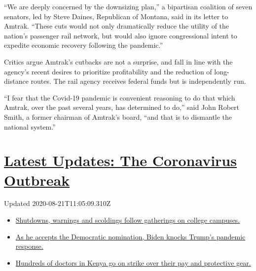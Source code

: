 ``We are deeply concerned by the downsizing plan,'' a bipartisan
coalition of seven senators, led by Steve Daines, Republican of Montana,
said in its letter to Amtrak. ``These cuts would not only dramatically
reduce the utility of the nation's passenger rail network, but would
also ignore congressional intent to expedite economic recovery following
the pandemic.''

Critics argue Amtrak's cutbacks are not a surprise, and fall in line
with the agency's recent desires to prioritize profitability and the
reduction of long-distance routes. The rail agency receives federal
funds but is independently run.

``I fear that the Covid-19 pandemic is convenient reasoning to do that
which Amtrak, over the past several years, has determined to do,'' said
John Robert Smith, a former chairman of Amtrak's board, ``and that is to
dismantle the national system.''

\hypertarget{latest-updates-the-coronavirus-outbreak}{%
\section{\texorpdfstring{\href{https://www.nytimes3xbfgragh.onion/2020/08/21/world/covid-19-coronavirus.html?action=click\&pgtype=Article\&state=default\&region=MAIN_CONTENT_1\&context=storylines_live_updates}{Latest
Updates: The Coronavirus
Outbreak}}{Latest Updates: The Coronavirus Outbreak}}\label{latest-updates-the-coronavirus-outbreak}}

Updated 2020-08-21T11:05:09.310Z

\begin{itemize}
\tightlist
\item
  \href{https://www.nytimes3xbfgragh.onion/2020/08/21/world/covid-19-coronavirus.html?action=click\&pgtype=Article\&state=default\&region=MAIN_CONTENT_1\&context=storylines_live_updates\#link-4690b6aa}{Shutdowns,
  warnings and scoldings follow gatherings on college campuses.}
\item
  \href{https://www.nytimes3xbfgragh.onion/2020/08/21/world/covid-19-coronavirus.html?action=click\&pgtype=Article\&state=default\&region=MAIN_CONTENT_1\&context=storylines_live_updates\#link-324af071}{As
  he accepts the Democratic nomination, Biden knocks Trump's pandemic
  response.}
\item
  \href{https://www.nytimes3xbfgragh.onion/2020/08/21/world/covid-19-coronavirus.html?action=click\&pgtype=Article\&state=default\&region=MAIN_CONTENT_1\&context=storylines_live_updates\#link-35890b73}{Hundreds
  of doctors in Kenya go on strike over their pay and protective gear.}
\end{itemize}

